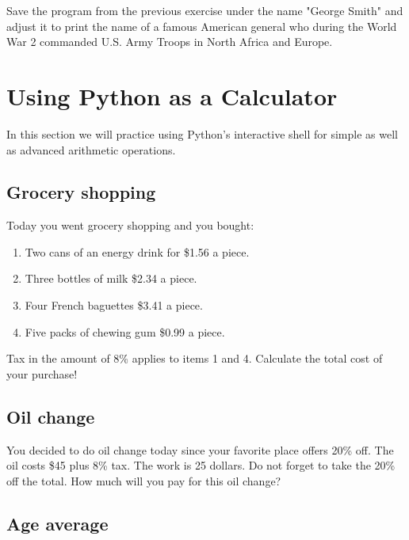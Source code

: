Save the program from the previous exercise under the name 
"George Smith" and adjust it to print the name of a famous American
general who during the World War 2 commanded U.S. Army Troops
in North Africa and Europe. 


\section{Using Python as a Calculator}

In this section we will practice using Python's interactive shell for simple 
as well as advanced arithmetic operations.


\subsection{Grocery shopping}

Today you went grocery shopping and you bought:
\begin{enumerate}
\item Two cans of an energy drink for \$1.56 a piece.
\item Three bottles of milk \$2.34 a piece.
\item Four French baguettes \$3.41 a piece.
\item Five packs of chewing gum \$0.99 a piece.
\end{enumerate}
Tax in the amount of 8\% applies to items 1 and 4.
Calculate the total cost of your purchase!


\subsection{Oil change}

You decided to do oil change today since your favorite 
place offers 20\% off. The oil costs \$45 plus 8\% tax. 
The work is 25 dollars. Do not forget to take the 20\% off the 
total. How much will you pay for this oil change? 


\subsection{Age average}

